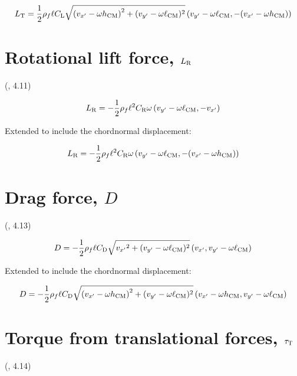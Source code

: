 \documentclass{jfm} %
\begin{document}
\begin{equation}
L_{\textnormal{T}} = \frac{1}{2}\rho_f\ell C_{\textnormal{L}}\sqrt{\left ( {v_{x'}}- \omega h_{\textup{CM}} \right )^2+(v_{y'}- \omega \ell_{\textup{CM}})^2}\left ( v_{y'}- \omega\ell_{\textup{CM}}, -({v_{x'}}- \omega h_{\textup{CM}}) \right ) 
\end{equation}

\section{Rotational lift force, $L_{\textnormal{R}}$} 
(\cite{Li2022model}, 4.11)
\label{sec:lr}

\begin{equation}
 L_{\textnormal{R}} = -\frac{1}{2}\rho_f\ell^2 C_{\textnormal{R}}\omega\left ( v_{y'}- \omega\ell_{\textup{CM}}, -{v_{x'}} \right )
\end{equation}

Extended to include the chordnormal displacement:

\begin{equation}
 L_{\textnormal{R}} = -\frac{1}{2}\rho_f\ell^2 C_{\textnormal{R}}\omega\left ( v_{y'}- \omega\ell_{\textup{CM}}, -({v_{x'}}- \omega h_{\textup{CM}} )\right )
\end{equation}

\section{Drag force, $D$} \label{sec:d}
(\cite{Li2022model}, 4.13)

\begin{equation}
D = -\frac{1}{2}\rho_f\ell C_{\textnormal{D}} \sqrt{{v_{x'}}^2+(v_{y'}- \omega \ell_{\textup{CM}})^2}\left ( v_{x'},v_{y'}- \omega\ell_{\textup{CM}} \right )
\end{equation}

Extended to include the chordnormal displacement:

\begin{equation}
D = -\frac{1}{2}\rho_f\ell C_{\textnormal{D}} \sqrt{\left ( {v_{x'}}- \omega h_{\textup{CM}} \right )^2+(v_{y'}- \omega \ell_{\textup{CM}})^2}\left ({v_{x'}}- \omega h_{\textup{CM}} ,v_{y'}- \omega\ell_{\textup{CM}} \right ) 
\end{equation}

\section{Torque from translational forces, $\tau_\textnormal{T}$} \label{sec:t1}
(\cite{Li2022model}, 4.14)
\end{document}
